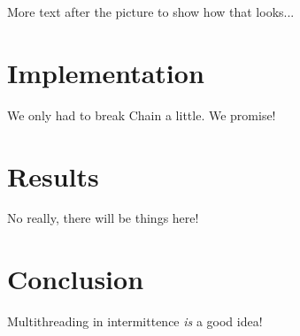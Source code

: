 \documentclass[10pt]{sensys-proc}
\newcommand{\chain}{Chain\xspace}
\begin{document}
More text after the picture to show how that looks...


\section{Implementation}
We only had to break \chain a little. We promise!


\section{Results}
No really, there will be things here!


\section{Conclusion}
Multithreading in intermittence {\em is} a good idea! 


\balance

\end{document}
